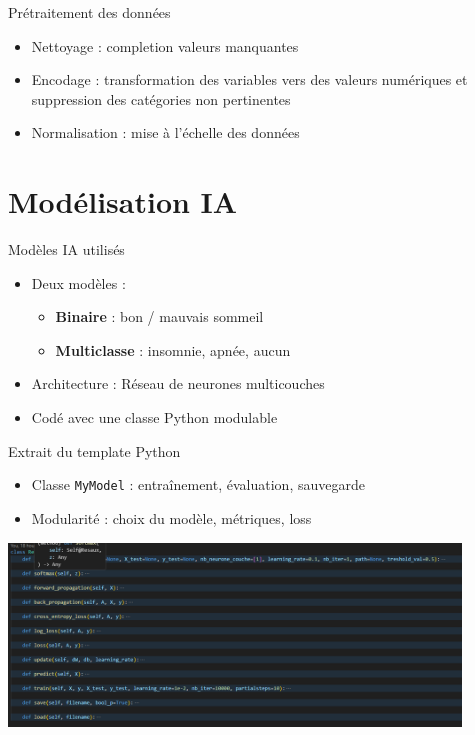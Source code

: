 \documentclass{beamer}
\begin{document}
\begin{frame}{Prétraitement des données}
  \begin{itemize}
    \item Nettoyage : completion valeurs manquantes
    \item Encodage : transformation des variables vers des valeurs numériques et suppression des catégories non pertinentes
    \item Normalisation : mise à l'échelle des données
  \end{itemize}
\end{frame}

\section{Modélisation IA}

\begin{frame}{Modèles IA utilisés}
  \begin{itemize}
    \item Deux modèles :
    \begin{itemize}
      \item \textbf{Binaire} : bon / mauvais sommeil
      \item \textbf{Multiclasse} : insomnie, apnée, aucun
    \end{itemize}
    \item Architecture : Réseau de neurones multicouches
    \item Codé avec une classe Python modulable
  \end{itemize}
\end{frame}

\begin{frame}{Extrait du template Python}
  \begin{itemize}
    \item Classe \texttt{MyModel} : entraînement, évaluation, sauvegarde
    \item Modularité : choix du modèle, métriques, loss
  \end{itemize}
  \includegraphics[width=0.9\textwidth]{screen_code.png}
\end{frame}
\end{document}
